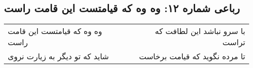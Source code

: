 \begin{center}
\section*{رباعی شماره ۱۲: وه وه که قیامتست این قامت راست}
\label{sec:012}
\begin{longtable}{l p{0.5cm} r}
وه وه که قیامتست این قامت راست
&&
با سرو نباشد این لطافت که تراست
\\
شاید که تو دیگر به زیارت نروی
&&
تا مرده نگوید که قیامت برخاست
\\
\end{longtable}
\end{center}
